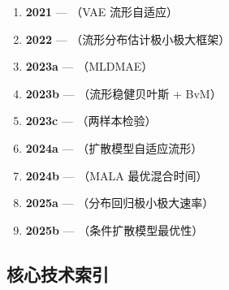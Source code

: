 \documentclass[12pt]{amsbook}
\theoremstyle{plain}
\begin{document}
\begin{enumerate}
    \item \textbf{2021} --- \citep{tang2021vae}（VAE 流形自适应）
    \item \textbf{2022} --- \citep{tang2022minimax}
          （流形分布估计极小极大框架）
    \item \textbf{2023a} --- \citep{tang2023lowdim}（MLDMAE）
    \item \textbf{2023b} --- \citep{tang2023robust}
          （流形稳健贝叶斯 + BvM）
    \item \textbf{2023c} --- \citep{tang2023twosample}（两样本检验）
    \item \textbf{2024a} --- \citep{tang2024diffusion}（扩散模型自适应流形）
    \item \textbf{2024b} --- \citep{tang2024mala}（MALA 最优混合时间）
    \item \textbf{2025a} --- \citep{tang2025regression}（分布回归极小极大速率）
    \item \textbf{2025b} --- \citep{tang2025conditional}（条件扩散模型最优性）
\end{enumerate}

\subsection{核心技术索引}\label{sec:tang-tech-index}
\end{document}
